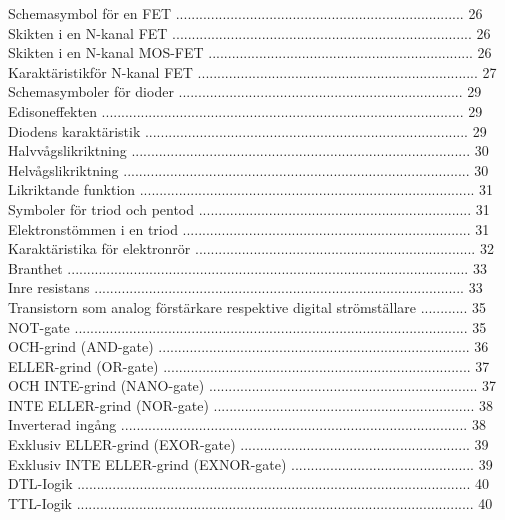 \documentclass[a4paper,twoside,twocolumn,openright]{book}
\begin{document}
{{{{{{{{{{{Schemasymbol för en FET .......................................................................... 26
Skikten i en N-kanal FET ............................................................................. 26
Skikten i en N-kanal MOS-FET .................................................................... 26
Karaktäristikför N-kanal FET ........................................................................ 27
Schemasymboler för dioder ......................................................................... 29
Edisoneffekten ............................................................................................. 29
Diodens karaktäristik ................................................................................... 29
Halvvågslikriktning ....................................................................................... 30
Helvågslikriktning ......................................................................................... 30
Likriktande funktion ...................................................................................... 31
Symboler för triod och pentod ...................................................................... 31
Elektronstömmen i en triod .......................................................................... 31
Karaktäristika för elektronrör ........................................................................ 32
Branthet ....................................................................................................... 33
Inre resistans ............................................................................................... 33
Transistorn som analog förstärkare respektive digital strömställare ............ 35
NOT-gate ..................................................................................................... 35
OCH-grind (AND-gate) ................................................................................ 36
ELLER-grind (OR-gate) ............................................................................... 37
OCH INTE-grind (NANO-gate) ..................................................................... 37
INTE ELLER-grind (NOR-gate) ................................................................... 38
Inverterad ingång ......................................................................................... 38
Exklusiv ELLER-grind (EXOR-gate) ........................................................... 39
Exklusiv INTE ELLER-grind (EXNOR-gate) ............................................... 39
DTL-Iogik ..................................................................................................... 40
TTL-Iogik ...................................................................................................... 40

}}}}}}}}}}}
\end{document}
